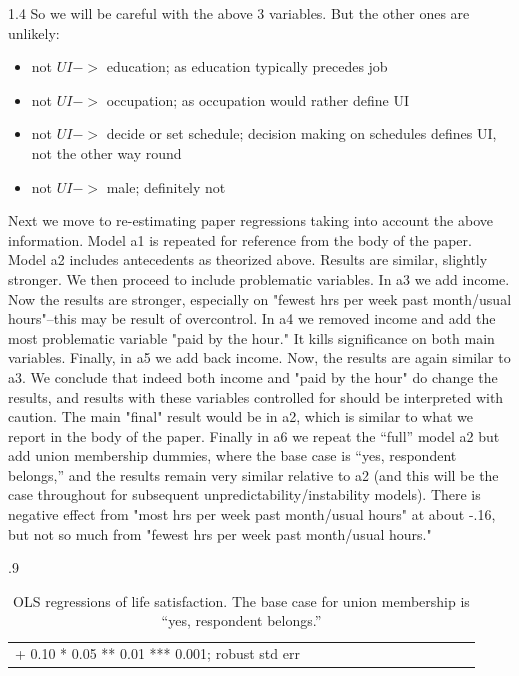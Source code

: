 \documentclass[10pt, letterpaper]{article}
\begin{document}
\begin{spacing}{1.4}
So we will be careful with the above 3 variables. But the other ones are unlikely:

\begin{itemize}
\item not $UI ->$ education; as education typically precedes job
\item not $UI ->$ occupation; as occupation would rather define UI
\item not $UI ->$ decide or set schedule; decision making on schedules defines UI, not the other way round
\item not $UI ->$ male; definitely not
\end{itemize}


Next we move to re-estimating paper regressions taking into account the above information. 
Model a1 is repeated for reference from the body of the paper. Model a2 includes antecedents as theorized above. Results are similar, slightly stronger. We then proceed to include problematic variables. In a3 we add income. Now the results are
stronger, especially on "fewest hrs per week past month/usual hours"--this may be result of overcontrol. 
In a4 we removed income and add the most problematic variable "paid by the hour." It kills significance on both main variables. Finally, in a5 we add back income. Now, the results are again similar to a3. We conclude that indeed both income and "paid by the hour" do change the results, and results with these variables controlled for should be interpreted with caution. The main "final" result would be in a2, which is similar to what we report in the body of the paper. Finally in a6 we repeat the ``full'' model a2
but add union membership dummies, where the base case is ``yes, respondent belongs,'' and the results remain very similar relative to a2 (and this will be the case throughout for subsequent unpredictability/instability models). There is negative effect from "most hrs per week past month/usual hours" at about -.16, but not so much from "fewest hrs per week past month/usual hours."

\begin{spacing}{.9} \begin{table}[H]\centering   \begin{scriptsize} \begin{tabular}{p{1.8in}p{.5in}p{.5in}p{.5in}p{.5in}p{.5in}p{.5in}p{.5in}p{.5in}p{.5in}p{.5 in}p{.5in}p{.5 in}}\hline  \hline + 0.10 * 0.05 ** 0.01 *** 0.001; robust std err \end{tabular}\end{scriptsize}\caption{\label{c-a}OLS regressions of life satisfaction. The base case for union membership is ``yes, respondent belongs.''}\end{table} \end{spacing}


\end{spacing}
\end{document}
